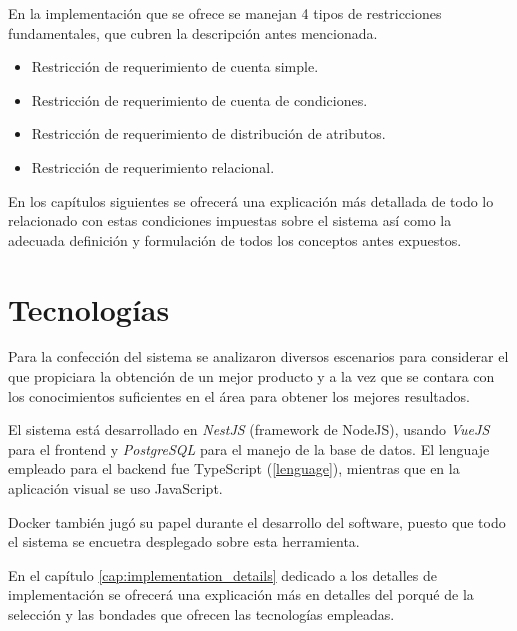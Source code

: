 En la implementación que se ofrece se manejan 4 tipos de restricciones fundamentales, que cubren la descripción antes mencionada.
\begin{itemize}
	\item Restricción de requerimiento de cuenta simple.
	\item Restricción de requerimiento de cuenta de condiciones.
	\item Restricción de requerimiento de distribución de atributos.
	\item Restricción de requerimiento relacional.
\end{itemize}
En los capítulos siguientes se ofrecerá una explicación más detallada de todo lo relacionado con estas condiciones impuestas sobre el sistema así como la adecuada definición y formulación de todos los conceptos antes expuestos.

\section{Tecnologías}

Para la confección del sistema se analizaron diversos escenarios para considerar el que propiciara la obtención de un mejor producto y a la vez que se contara con los conocimientos suficientes en el área para obtener los mejores resultados. 

El sistema está desarrollado en \textit{NestJS} (framework de NodeJS), usando \textit{VueJS} para el frontend y \textit{PostgreSQL} para el manejo de la base de datos. El lenguaje empleado para el backend fue TypeScript (\ref{lenguage}), mientras que en la aplicación visual se uso JavaScript.

Docker también jugó su papel durante el desarrollo del software, puesto que todo el sistema se encuetra desplegado sobre esta herramienta.

En el capítulo \ref{cap:implementation_details} dedicado a los detalles de implementación se ofrecerá una explicación más en detalles del porqué de la selección y las bondades que ofrecen las tecnologías empleadas.

